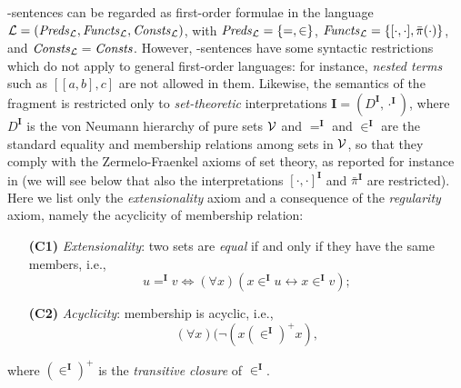 \documentclass[a4paper]{llncs}
\newcommand{\Lang}{\ensuremath{\mathcal{L}\xspace}} %
\newcommand{\LangPreds}{\Preds_{\Lang}}
\newcommand{\LangFuncts}{\Functs_{\Lang}}
\newcommand{\LangConsts}{\Consts_{\Lang}}
\newcommand{\nonpairssym}{\bar{\pi}}
\newcommand{\nonpairs}[1]{\nonpairssym(#1)}
\newcommand{\inter}{\ensuremath{\mathbf{I}}\xspace}
\begin{document}
\Forallpizero-sentences can be regarded as first-order
formulae in the language $\Lang=(\LangPreds, \LangFuncts, \LangConsts)$, with
$\LangPreds=\{ = ,\in \}$, $\LangFuncts=\{ [\cdot, \cdot], 
\nonpairs{\cdot} \}$,
and $\LangConsts=\Consts$. However, \Forallpizero-sentences have some
syntactic restrictions which do not apply to general first-order
languages: for instance, \emph{nested terms} such as $[[a,b],c]$ are not
allowed in them. Likewise, the semantics of the fragment 
\Forallpizero is restricted only to \emph{set-theoretic} 
interpretations $\inter=(D^{\inter}, \cdot^\inter)$, where 
$D^{\inter}$ is the von Neumann hierarchy of pure sets $\mathcal{V}$ and 
$=^{\inter}$ and $\in^{\inter}$ are the standard equality and 
membership relations among sets in $\mathcal{V}$, so that they comply with 
the Zermelo-Fraenkel axioms of set theory, as reported for instance 
in \cite{Mos2005} (we will see below  that  also the interpretations 
$[\cdot,\cdot]^\inter$ and $\nonpairssym^{\inter}$ are restricted).
Here we list only the \emph{extensionality} axiom and a consequence 
of the \emph{regularity} axiom, namely the acyclicity of membership 
relation:
\begin{enumerate}[leftmargin=.9cm]
  \item[\textbf{(C1)}]\label{EXT} \emph{Extensionality}: two sets are 
\emph{equal} if and only if they have the same members, i.e.,
\[
  u =^{\inter} v \iff (\forall x)(x \in^{\inter} u \leftrightarrow x 
\in^{\inter} v) ;
\]
  \item[\textbf{(C2)}]\label{REG} \emph{Acyclicity}: membership is 
acyclic, i.e.,
\[
  (\forall x)(\neg (x \mathrel{(\in^{\inter})^{+}} x) ,
\]
\end{enumerate}
where $(\in^{\inter})^{+}$ is the \emph{transitive closure} of $\in^{\inter}$.
%
\end{document}
